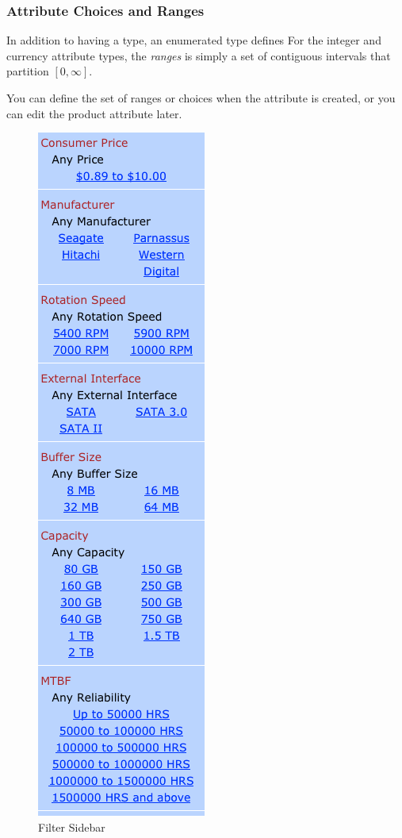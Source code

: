 \documentclass[letterpaper, 12pt]{article}
\begin{document}
\subsubsection{Attribute Choices and Ranges}
In addition to having a type, an enumerated type defines
For the integer and currency attribute types, the \textit{ranges} is simply a set of contiguous intervals that partition $[0, \infty]$.

You can define the set of ranges or choices when the attribute is created, or you can edit the product attribute later.



\begin{figure}
\begin{center}
\includegraphics[scale=0.4]{attribute-sidebar}
\end{center}
\caption{Filter Sidebar}
\end{figure}
\end{document}
